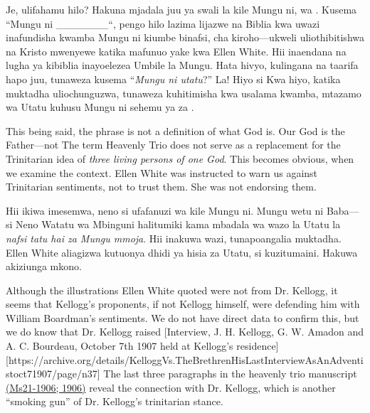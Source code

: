 Je, ulifahamu hilo? Hakuna mjadala juu ya swali la kile Mungu ni,  wa . Kusema “Mungu ni \_\_\_\_\_\_\_“, pengo hilo lazima lijazwe na  Biblia kwa uwazi inafundisha kwamba Mungu ni kiumbe binafsi, cha kiroho—ukweli uliothibitishwa na Kristo mwenyewe katika mafunuo yake kwa Ellen White. Hii inaendana na lugha ya kibiblia inayoelezea Umbile la Mungu. Hata hivyo, kulingana na taarifa hapo juu, tunaweza kusema “\textit{Mungu ni utatu}?” La! Hiyo si  Kwa hiyo, katika muktadha uliochunguzwa, tunaweza kuhitimisha kwa usalama kwamba, mtazamo wa Utatu kuhusu Mungu ni sehemu ya  za .


This being said, the phrase  is not a definition of what God is. Our God is the Father—not  The term Heavenly Trio does not serve as a replacement for the Trinitarian idea of \textit{three living persons of one God}. This becomes obvious, when we examine the context. Ellen White was instructed to warn us against Trinitarian sentiments, not to trust them. She was not endorsing them.


Hii ikiwa imesemwa, neno  si ufafanuzi wa kile Mungu ni. Mungu wetu ni Baba—si  Neno Watatu wa Mbinguni halitumiki kama mbadala wa wazo la Utatu la \textit{nafsi tatu hai za Mungu mmoja}. Hii inakuwa wazi, tunapoangalia muktadha. Ellen White aliagizwa kutuonya dhidi ya hisia za Utatu, si kuzitumaini. Hakuwa akiziunga mkono.


Although the illustrations Ellen White quoted were not from Dr. Kellogg, it seems that Kellogg's proponents, if not Kellogg himself, were defending him with William Boardman's sentiments. We do not have direct data to confirm this, but we do know that Dr. Kellogg raised [Interview, J. H. Kellogg, G. W. Amadon and A. C. Bourdeau, October 7th 1907 held at Kellogg’s residence][https://archive.org/details/KelloggVs.TheBrethrenHisLastInterviewAsAnAdventistoct71907/page/n37] The last three paragraphs in the heavenly trio manuscript \href{https://egwwritings.org/?ref=en_Ms21-1906&para=9754.1}{(Ms21-1906; 1906)} reveal the connection with Dr. Kellogg, which is another “smoking gun” of Dr. Kellogg's trinitarian stance.


